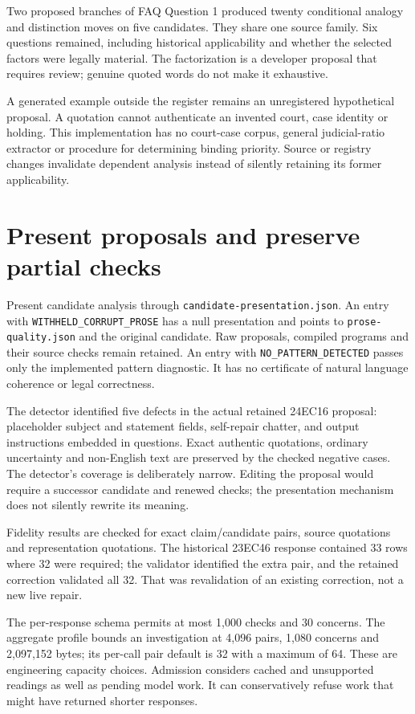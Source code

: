 \documentclass[12pt,a4paper,oneside,openany]{book}
\begin{document}
Two proposed branches of FAQ Question 1 produced twenty conditional analogy
and distinction moves on five candidates. They share one source family. Six
questions remained, including historical applicability and whether the selected
factors were legally material. The factorization is a developer proposal that
requires review; genuine quoted words do not make it exhaustive.

A generated example outside the register remains an unregistered hypothetical
proposal. A quotation cannot authenticate an invented court, case identity or
holding. This implementation has no court-case corpus, general judicial-ratio
extractor or procedure for determining binding priority. Source or registry
changes invalidate dependent analysis instead of silently retaining its former
applicability.

\section{Present proposals and preserve partial checks}

Present candidate analysis through \texttt{candidate-presentation.json}.
An entry with \texttt{WITHHELD\_CORRUPT\_PROSE} has a null presentation and points
to \texttt{prose-quality.json} and the original candidate. Raw proposals,
compiled programs and their source checks remain retained. An entry with
\texttt{NO\_PATTERN\_DETECTED} passes only the implemented pattern diagnostic.
It has no certificate of natural language coherence or legal correctness.

The detector identified five defects in the actual retained 24EC16 proposal:
placeholder subject and statement fields, self-repair chatter, and output
instructions embedded in questions. Exact authentic quotations, ordinary
uncertainty and non-English text are preserved by the checked negative cases.
The detector's coverage is deliberately narrow. Editing the proposal would
require a successor candidate and renewed checks; the presentation mechanism
does not silently rewrite its meaning.

Fidelity results are checked for exact claim/candidate pairs, source quotations
and representation quotations. The historical 23EC46 response contained 33 rows
where 32 were required; the validator identified the extra pair, and the
retained correction validated all 32. That was revalidation of an existing
correction, not a new live repair.

The per-response schema permits at most 1,000 checks and 30 concerns. The
aggregate profile bounds an investigation at 4,096 pairs, 1,080 concerns and
2,097,152 bytes; its per-call pair default is 32 with a maximum of 64. These
are engineering capacity choices. Admission considers cached and unsupported
readings as well as pending model work. It can conservatively refuse work that
might have returned shorter responses.
\end{document}
